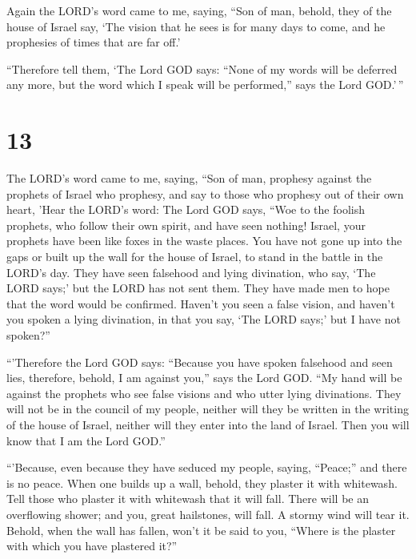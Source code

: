  Again the LORD's word came to me, saying, 
``Son of man, behold, they of the house of Israel say, `The vision that
he sees is for many days to come, and he prophesies of times that are
far off.'

 ``Therefore tell them, `The Lord GOD says: ``None of my
words will be deferred any more, but the word which I speak will be
performed,'' says the Lord GOD.'\,''

\hypertarget{section-11}{%
\section{13}\label{section-11}}

 The LORD's word came to me, saying,  ``Son of
man, prophesy against the prophets of Israel who prophesy, and say to
those who prophesy out of their own heart, 'Hear the LORD's word:
 The Lord GOD says, ``Woe to the foolish prophets, who
follow their own spirit, and have seen nothing!  Israel,
your prophets have been like foxes in the waste places.  You
have not gone up into the gaps or built up the wall for the house of
Israel, to stand in the battle in the LORD's day.  They have
seen falsehood and lying divination, who say, `The LORD says;' but the
LORD has not sent them. They have made men to hope that the word would
be confirmed.  Haven't you seen a false vision, and haven't
you spoken a lying divination, in that you say, `The LORD says;' but I
have not spoken?''

 ``'Therefore the Lord GOD says: ``Because you have spoken
falsehood and seen lies, therefore, behold, I am against you,'' says the
Lord GOD.  ``My hand will be against the prophets who see
false visions and who utter lying divinations. They will not be in the
council of my people, neither will they be written in the writing of the
house of Israel, neither will they enter into the land of Israel. Then
you will know that I am the Lord GOD.''

 ``'Because, even because they have seduced my people,
saying, ``Peace;'' and there is no peace. When one builds up a wall,
behold, they plaster it with whitewash.  Tell those who
plaster it with whitewash that it will fall. There will be an
overflowing shower; and you, great hailstones, will fall. A stormy wind
will tear it.  Behold, when the wall has fallen, won't it
be said to you, ``Where is the plaster with which you have plastered
it?''

